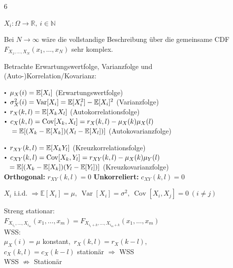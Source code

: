 \documentclass[8pt,a4paper,landscape]{extarticle}
\begin{document}
\begin{multicols*}{6}

$X_i:\Omega \to \mathbb{R},\ i\in\mathbb{N}$

Bei $N\to\infty$ wäre die vollstandige Beschreibung über die gemeinsame CDF
$F_{X_1,\dots,X_N}(x_1,\dots,x_N)$ sehr komplex.


Betrachte Erwartungswertfolge, Varianzfolge und \\
(Auto-)Korrelation/Kovarianz:

$\sbullet\ \mu_X(i)=\mathbb{E}[X_i]$ ({\color{orange}Erwartungswertfolge}) \\
$\sbullet\ \sigma_X^2(i)=\operatorname{Var}[X_i]=\mathbb{E}[X_i^2]-\mathbb{E}[X_i]^2$ ({\color{orange}Varianzfolge}) \\
$\sbullet\ r_X(k,l)=\mathbb{E}[X_kX_l]$ ({\color{orange}Autokorrelationsfolge}) \\
$\sbullet\ c_X(k,l)=\operatorname{Cov}[X_k,X_l]=r_X(k,l)-\mu_X(k)\mu_X(l)$ \\
$\phantom{\sbullet\ }=\mathbb{E}[(X_k-\mathbb{E}[X_k])(X_l-\mathbb{E}[X_l])]$ ({\color{orange}Autokovarianzfolge})


$\sbullet\ r_{XY}(k,l)=\mathbb{E}[X_kY_l]$ ({\color{orange}Kreuzkorrelationsfolge}) \\
$\sbullet\ c_{XY}(k,l)=\operatorname{Cov}[X_k,Y_l]=r_{XY}(k,l)-\mu_X(k)\mu_Y(l)$ \\
$\phantom{\sbullet }=\mathbb{E}[(X_k-\mathbb{E}[X_k])(Y_l-\mathbb{E}[Y_l])]$ ({\color{orange}Kreuzkovarianzfolge}) \\
\textbf{Orthogonal:} $r_{XY}(k,l)=0$ \quad \textbf{Unkorreliert:} $c_{XY}(k,l)=0$


$X_i$ i.i.d. $\Rightarrow \mathbb{E}[X_i]=\mu,\ \operatorname{Var}[X_i]=\sigma^2,\ \operatorname{Cov}[X_i,X_j]=0\ (i\neq j)$


{\color{orange}Streng stationar:} \\
$F_{X_{i_1},\dots,X_{i_m}}(x_1,\dots,x_m)=F_{X_{i_1+k},\dots,X_{i_m+k}}(x_1,\dots,x_m)$ \\
{\color{orange}WSS:} \\
$\mu_X(i)=\mu$ konstant,\ $r_X(k,l)=r_X(k-l)$,\\ 
$c_X(k,l)=c_X(k-l)$ 
\CheatsheetItemListStart
\CheatsheetItemListEnd
stationär $\Rightarrow$ WSS \\
WSS $\nRightarrow$ Stationär 


\end{multicols*}
\end{document}

